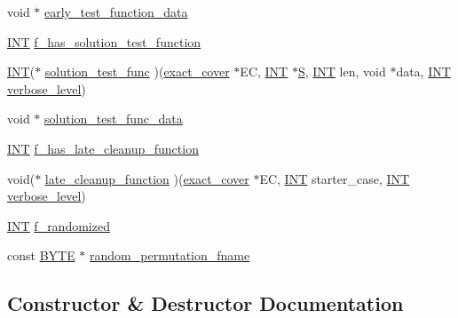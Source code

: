 \begin{DoxyCompactItemize}
void $\ast$ \mbox{\hyperlink{classexact__cover__arguments_af4dc73c0321a085d5bc9ef0f754fda38}{early\+\_\+test\+\_\+function\+\_\+data}}
\item 
\mbox{\hyperlink{galois_8h_a09fddde158a3a20bd2dcadb609de11dc}{I\+NT}} \mbox{\hyperlink{classexact__cover__arguments_add2a337a9291fb72986b938fa415e51b}{f\+\_\+has\+\_\+solution\+\_\+test\+\_\+function}}
\item 
\mbox{\hyperlink{galois_8h_a09fddde158a3a20bd2dcadb609de11dc}{I\+NT}}($\ast$ \mbox{\hyperlink{classexact__cover__arguments_adf09f79cb27ced0b3e996d6cb065c00b}{solution\+\_\+test\+\_\+func}} )(\mbox{\hyperlink{classexact__cover}{exact\+\_\+cover}} $\ast$EC, \mbox{\hyperlink{galois_8h_a09fddde158a3a20bd2dcadb609de11dc}{I\+NT}} $\ast$\mbox{\hyperlink{simeon_8_c_adab47f8243f1b5a2c31df2535d6b37d0}{S}}, \mbox{\hyperlink{galois_8h_a09fddde158a3a20bd2dcadb609de11dc}{I\+NT}} len, void $\ast$data, \mbox{\hyperlink{galois_8h_a09fddde158a3a20bd2dcadb609de11dc}{I\+NT}} \mbox{\hyperlink{simeon_8_c_a818073fbcc2f439e7c56952f67386122}{verbose\+\_\+level}})
\item 
void $\ast$ \mbox{\hyperlink{classexact__cover__arguments_a8579bce78885a765797e8c14a778e3cb}{solution\+\_\+test\+\_\+func\+\_\+data}}
\item 
\mbox{\hyperlink{galois_8h_a09fddde158a3a20bd2dcadb609de11dc}{I\+NT}} \mbox{\hyperlink{classexact__cover__arguments_a3662b57d2c69383da2aab99fedbf4198}{f\+\_\+has\+\_\+late\+\_\+cleanup\+\_\+function}}
\item 
void($\ast$ \mbox{\hyperlink{classexact__cover__arguments_a9fb158e1a43b8821db17c3f1426b755c}{late\+\_\+cleanup\+\_\+function}} )(\mbox{\hyperlink{classexact__cover}{exact\+\_\+cover}} $\ast$EC, \mbox{\hyperlink{galois_8h_a09fddde158a3a20bd2dcadb609de11dc}{I\+NT}} starter\+\_\+case, \mbox{\hyperlink{galois_8h_a09fddde158a3a20bd2dcadb609de11dc}{I\+NT}} \mbox{\hyperlink{simeon_8_c_a818073fbcc2f439e7c56952f67386122}{verbose\+\_\+level}})
\item 
\mbox{\hyperlink{galois_8h_a09fddde158a3a20bd2dcadb609de11dc}{I\+NT}} \mbox{\hyperlink{classexact__cover__arguments_af9155e3c361dbff51f4bdaab709803d3}{f\+\_\+randomized}}
\item 
const \mbox{\hyperlink{galois_8h_ab6cc7b4aeb6ea31aba2b3fbfc83ff5e6}{B\+Y\+TE}} $\ast$ \mbox{\hyperlink{classexact__cover__arguments_a751900e58598a7d8f1793aa361309884}{random\+\_\+permutation\+\_\+fname}}
\end{DoxyCompactItemize}


\subsection{Constructor \& Destructor Documentation}
\mbox{\label{classexact__cover__arguments_a568649c5869d4322939c499db6a0d824}} 
